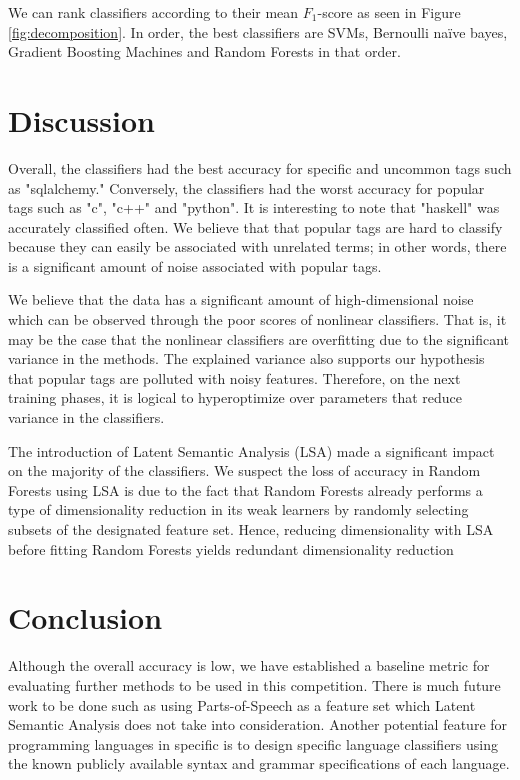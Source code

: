 \documentclass{sig-alternate}
\newcommand{\Fone}{$F_1$}
\begin{document}
	We can rank classifiers according to their mean \Fone-score as seen in
	Figure \ref{fig:decomposition}. In order, the best classifiers are SVMs,
	Bernoulli na\"{i}ve bayes, Gradient Boosting Machines and Random Forests in
	that order.

\section{Discussion} %
\label{sec:Discussion}
	Overall, the classifiers had the best accuracy for specific and uncommon tags
	such as "sqlalchemy." Conversely, the classifiers had the worst accuracy for
	popular tags such as "c", "c++" and "python". It is interesting to note that
	"haskell" was accurately classified often. We believe that that popular tags
	are hard to classify because they can easily be associated with unrelated
	terms; in other words, there is a significant amount of noise associated
	with popular tags.

	We believe that the data has a significant amount of high-dimensional noise
	which can be observed through the poor scores of nonlinear classifiers.
	That is, it may be the case that the nonlinear classifiers are overfitting
	due to the significant variance in the methods. The explained variance also
	supports our hypothesis that popular tags are polluted with noisy features.
	Therefore, on the next training phases, it is logical to hyperoptimize over
	parameters that reduce variance in the classifiers.

	The introduction of Latent Semantic Analysis (LSA) made a significant
	impact on the majority of the classifiers. We suspect the loss of accuracy
	in Random Forests using LSA is due to the fact that Random Forests already
	performs a type of dimensionality reduction in its weak learners by
	randomly selecting subsets of the designated feature set. Hence, reducing
	dimensionality with LSA before fitting Random Forests yields redundant
	dimensionality reduction

\section{Conclusion} %
\label{sec:Conclusion}
	Although the overall accuracy is low, we have established a baseline metric
	for evaluating further methods to be used in this competition. There is
	much future work to be done such as using Parts-of-Speech as a feature set
	which Latent Semantic Analysis does not take into consideration. Another
	potential feature for programming languages in specific is to design
	specific language classifiers using the known publicly available syntax and
	grammar specifications of each language.
\end{document}
